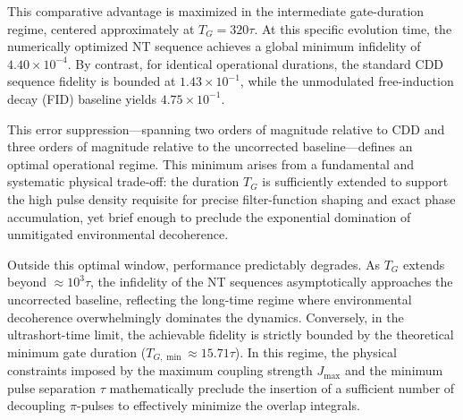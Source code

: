 \documentclass[%
 reprint,
superscriptaddress,
 amsmath,amssymb,
 aps,
pra,
]{revtex4-2}
\begin{document}
This comparative advantage is maximized in the intermediate gate-duration regime, centered approximately at $T_G = 320\tau$. At this specific evolution time, the numerically optimized NT sequence achieves a global minimum infidelity of $4.40 \times 10^{-4}$. By contrast, for identical operational durations, the standard CDD sequence fidelity is bounded at $1.43 \times 10^{-1}$, while the unmodulated free-induction decay (FID) baseline yields $4.75 \times 10^{-1}$. 

This error suppression—spanning two orders of magnitude relative to CDD and three orders of magnitude relative to the uncorrected baseline—defines an optimal operational regime. This minimum arises from a fundamental and systematic physical trade-off: the duration $T_G$ is sufficiently extended to support the high pulse density requisite for precise filter-function shaping and exact phase accumulation, yet brief enough to preclude the exponential domination of unmitigated environmental decoherence.

Outside this optimal window, performance predictably degrades. As $T_G$ extends beyond $\approx 10^3\tau$, the infidelity of the NT sequences asymptotically approaches the uncorrected baseline, reflecting the long-time regime where environmental decoherence overwhelmingly dominates the dynamics. Conversely, in the ultrashort-time limit, the achievable fidelity is strictly bounded by the theoretical minimum gate duration ($T_{G,\min} \approx 15.71\tau$). In this regime, the physical constraints imposed by the maximum coupling strength $J_{\text{max}}$ and the minimum pulse separation $\tau$ mathematically preclude the insertion of a sufficient number of decoupling $\pi$-pulses to effectively minimize the overlap integrals.
\end{document}
